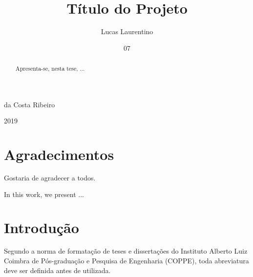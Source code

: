 \documentclass[grad,numbers]{coppe}
\begin{document}
    \title{Título do Projeto}
    \author{Lucas Laurentino}{da Costa Ribeiro}

    
    
    
    
    \date{07}{2019}
    
    
    \maketitle
    
    \frontmatter

\dedication{A alguém cujo valor é digno desta dedicatória.}

\chapter*{Agradecimentos}

  Gostaria de agradecer a todos.

\begin{abstract}

  Apresenta-se, nesta tese, ...

\end{abstract}

\begin{foreignabstract}

In this work, we present ...

\end{foreignabstract}

\tableofcontents
\listoffigures
\listoftables
\printlosymbols
\printloabbreviations

\mainmatter
\chapter{Introdução}

  Segundo a norma de formatação de teses e dissertações do
  Instituto Alberto Luiz Coimbra de Pós-graduação e Pesquisa de
  Engenharia (COPPE), toda abreviatura deve ser definida antes de
  utilizada.
\end{document}
